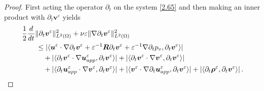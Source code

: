 \documentclass[pdflatex,sn-mathphys-num]{sn-jnl}%
\theoremstyle{thmstyleone}%
\theoremstyle{thmstyletwo}%
\theoremstyle{thmstylethree}%
\theoremstyle{thmstyletwo}
\begin{document}
\begin{proof}
	First acting the operator $\partial_t$ on the system \eqref{2.65} and then making an inner product with $\partial_t\boldsymbol{v}^\varepsilon$ yields
	\begin{align}
		\label{4.16.1}
		&\frac{1}{2}\frac{d}{dt}\lVert\partial_t\boldsymbol v^{\varepsilon}\rVert^2_{{L}^2(\Omega)}
		+\nu\varepsilon\lVert\nabla\partial_t\boldsymbol v^{\varepsilon}\rVert^2_{{L}^2(\Omega)}\notag\\
		&\qquad\leq
		|\langle{\boldsymbol u}^{\varepsilon} \cdot \nabla \partial_t{\boldsymbol v}^{\varepsilon}
		+	{\varepsilon}^{-1}\boldsymbol{R}
		\partial_t\boldsymbol v^{\varepsilon}
		+		{\varepsilon}^{-1}\nabla \partial_tp_v,\partial_t{\boldsymbol v}^{\varepsilon}\rangle|\notag\\
		&\qquad\quad+
		|\langle
		\partial_t{\boldsymbol v}^{\varepsilon}\cdot
		\nabla\boldsymbol{u}^{\varepsilon}_{app},
		\partial_t{\boldsymbol v}^{\varepsilon}
		\rangle|
		+
		|\langle
		\partial_t{\boldsymbol v}^{\varepsilon} \cdot \nabla\boldsymbol{v}^\varepsilon
		,\partial_t{\boldsymbol v}^{\varepsilon}\rangle|\notag\\
		&\qquad\quad+
		|\langle
		\partial_t{\boldsymbol u}_{app}^{\varepsilon} \cdot \nabla\boldsymbol{v}^\varepsilon
		,\partial_t{\boldsymbol v}^{\varepsilon}\rangle|
		+
		|\langle{\boldsymbol v}^{\varepsilon} \cdot \nabla\partial_t\boldsymbol{u}^\varepsilon_{app},
		\partial_t{\boldsymbol v}^{\varepsilon}\rangle|	
		+|\langle
		\partial_t\boldsymbol \rho^{\varepsilon}	,\partial_t{\boldsymbol v}^{\varepsilon}\rangle|
		\,.
	\end{align}
	

\end{proof}
\end{document}
